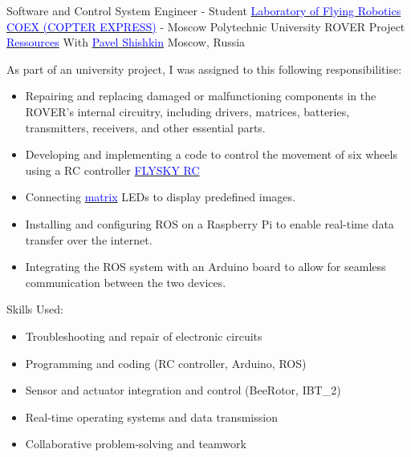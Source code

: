 \vspace{2mm}

    {Software and Control System Engineer - Student}
    {\href{https://mospolytech.ru/dovuzovskoe-obrazovanie/laboratoriya-letayushchej-robototekhniki/}{\textcolor{blue}{Laboratory of Flying Robotics COEX (COPTER EXPRESS)}} - Moscow Polytechnic University}
    {
    \newline
    ROVER Project
    \href{https://disk.yandex.ru/d/_G7udE6qSE2OYg}{\textcolor{blue}{Ressources}} With \href{https://t.me/PavelShi}{\textcolor{blue}{Pavel Shishkin}}
    }    
    {Moscow, Russia}
    {
    As part of an university project, I was assigned to this following responsibilitise:
    \begin{itemize}
        \item Repairing and replacing damaged or malfunctioning components in the ROVER's internal circuitry, including drivers, matrices, batteries, transmitters, receivers, and other essential parts.
        \item Developing and implementing a code to control the movement of six wheels using a RC controller \href{https://clover.coex.tech/en/radio.html}{\textcolor{blue}{FLYSKY RC}}
        \item Connecting \href{https://learn.adafruit.com/32x16-32x32-rgb-led-matrix/how-the-matrix-works}{\textcolor{blue}{matrix}} LEDs to display predefined images.
        \item Installing and configuring ROS on a Raspberry Pi to enable real-time data transfer over the internet.
        \item Integrating the ROS system with an Arduino board to allow for seamless communication between the two devices.
    \end{itemize}
    \vspace{2mm}
    Skills Used:
    \begin{itemize}
        \item Troubleshooting and repair of electronic circuits
        \item Programming and coding (RC controller, Arduino, ROS)
        \item Sensor and actuator integration and control (BeeRotor, IBT\_2)
        \item Real-time operating systems and data transmission
        \item Collaborative problem-solving and teamwork
    \end{itemize}
    }        


